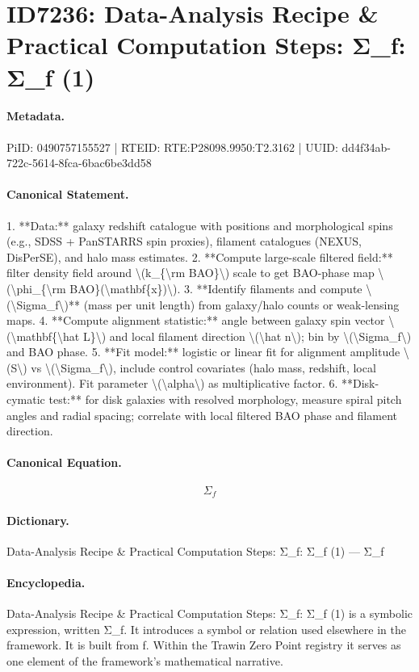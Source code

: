 \section*{ID7236: Data-Analysis Recipe \& Practical Computation Steps: Σ\_f: Σ\_f (1)}
\paragraph{Metadata.}
PiID: 0490757155527 | RTEID: RTE:P28098.9950:T2.3162 | UUID: dd4f34ab-722c-5614-8fca-6bac6be3dd58

\paragraph{Canonical Statement.}
1. **Data:** galaxy redshift catalogue with positions and morphological spins (e.g., SDSS + PanSTARRS spin proxies), filament catalogues (NEXUS, DisPerSE), and halo mass estimates. 2. **Compute large-scale filtered field:** filter density field around \textbackslash{}(k\_\{\textbackslash{}rm BAO\}\textbackslash{}) scale to get BAO-phase map \textbackslash{}(\textbackslash{}phi\_\{\textbackslash{}rm BAO\}(\textbackslash{}mathbf\{x\})\textbackslash{}). 3. **Identify filaments and compute \textbackslash{}(\textbackslash{}Sigma\_f\textbackslash{})** (mass per unit length) from galaxy/halo counts or weak-lensing maps. 4. **Compute alignment statistic:** angle between galaxy spin vector \textbackslash{}(\textbackslash{}mathbf\{\textbackslash{}hat L\}\textbackslash{}) and local filament direction \textbackslash{}(\textbackslash{}hat n\textbackslash{}); bin by \textbackslash{}(\textbackslash{}Sigma\_f\textbackslash{}) and BAO phase. 5. **Fit model:** logistic or linear fit for alignment amplitude \textbackslash{}(S\textbackslash{}) vs \textbackslash{}(\textbackslash{}Sigma\_f\textbackslash{}), include control covariates (halo mass, redshift, local environment). Fit parameter \textbackslash{}(\textbackslash{}alpha\textbackslash{}) as multiplicative factor. 6. **Disk-cymatic test:** for disk galaxies with resolved morphology, measure spiral pitch angles and radial spacing; correlate with local filtered BAO phase and filament direction.

\paragraph{Canonical Equation.}
\[
\Sigma_f
\]

\paragraph{Dictionary.}
Data-Analysis Recipe \& Practical Computation Steps: Σ\_f: Σ\_f (1) — Σ\_f

\paragraph{Encyclopedia.}
Data-Analysis Recipe \& Practical Computation Steps: Σ\_f: Σ\_f (1) is a symbolic expression, written Σ\_f. It introduces a symbol or relation used elsewhere in the framework. It is built from f. Within the Trawin Zero Point registry it serves as one element of the framework's mathematical narrative.
